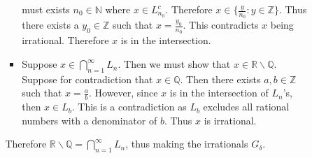 \documentclass[12pt, letterpaper]{article}
\newcommand{\Z}{\mathbb{Z}}
\newcommand{\N}{\mathbb{N}}
\newcommand{\R}{\mathbb{R}}
\newcommand{\Q}{\mathbb{Q}}
\begin{document}
\begin{enumerate}
\begin{enumerate}
\begin{itemize}
\begin{itemize}
				must exists $n_0 \in \N$ where $x \in L_{n_0}^c$.  Therefore $x \in \{\frac{y}{n_0}: y \in \Z\}$. Thus there exists a $y_0 \in \Z$ such that $x = \frac{y_0}{n_0}$.  This contradicts $x$ being irrational.  Therefore $x$ is in the intersection.
				\item Suppose $x \in \bigcap_{n=1}^\infty L_n$.  Then we must show that $x \in \R \backslash \Q$.  Suppose for contradiction that $x \in \Q$.  Then there exists $a,b \in \Z$ such that $x = \frac{a}{b}$.  However, since $x$ is in the intersection of $L_n$'s, then $x \in L_b$.  This is a contradiction as $L_b$ excludes all rational numbers with a denominator of $b$.  Thus $x$ is irrational.
			\end{itemize}
			Therefore $\R \backslash \Q = \displaystyle \bigcap_{n=1}^\infty L_n$,
			thus making the irrationals $G_\delta$.			 
		\end{itemize}
	\end{enumerate}
\end{enumerate}
\end{document}
